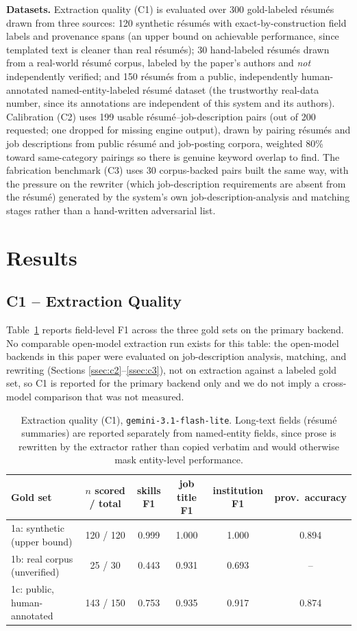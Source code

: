 \documentclass{article}
\begin{document}
\textbf{Datasets.} Extraction quality (C1) is evaluated over 300 gold-labeled résumés drawn from
three sources: 120 synthetic résumés with exact-by-construction field labels and provenance spans
(an upper bound on achievable performance, since templated text is cleaner than real résumés); 30
hand-labeled résumés drawn from a real-world résumé corpus, labeled by the paper's authors and
\emph{not} independently verified; and 150 résumés from a public, independently human-annotated
named-entity-labeled résumé dataset (the trustworthy real-data number, since its annotations are
independent of this system and its authors). Calibration (C2) uses 199 usable résumé--job-description
pairs (out of 200 requested; one dropped for missing engine output), drawn by pairing résumés and
job descriptions from public résumé and job-posting corpora, weighted 80\% toward same-category
pairings so there is genuine keyword overlap to find. The fabrication benchmark (C3) uses 30
corpus-backed pairs built the same way, with the pressure on the rewriter (which job-description
requirements are absent from the résumé) generated by the system's own job-description-analysis
and matching stages rather than a hand-written adversarial list.

\section{Results}
\label{sec:results}

\subsection{C1 -- Extraction Quality}

Table~\ref{tab:c1} reports field-level F1 across the three gold sets on the primary backend. No
comparable open-model extraction run exists for this table: the open-model backends in this paper
were evaluated on job-description analysis, matching, and rewriting (Sections
\ref{ssec:c2}--\ref{ssec:c3}), not on extraction against a labeled gold set, so C1 is reported for
the primary backend only and we do not imply a cross-model comparison that was not measured.

\begin{table}[h]
\centering
\caption{Extraction quality (C1), \texttt{gemini-3.1-flash-lite}. Long-text fields (résumé
summaries) are reported separately from named-entity fields, since prose is rewritten by the
extractor rather than copied verbatim and would otherwise mask entity-level performance.}
\label{tab:c1}
\begin{tabular}{lccccc}
\toprule
Gold set & $n$ scored / total & skills F1 & job title F1 & institution F1 & prov.\ accuracy \\
\midrule
1a: synthetic (upper bound) & 120 / 120 & 0.999 & 1.000 & 1.000 & 0.894 \\
1b: real corpus (unverified) & 25 / 30 & 0.443 & 0.931 & 0.693 & -- \\
1c: public, human-annotated & 143 / 150 & 0.753 & 0.935 & 0.917 & 0.874 \\
\bottomrule
\end{tabular}
\end{table}
\end{document}
